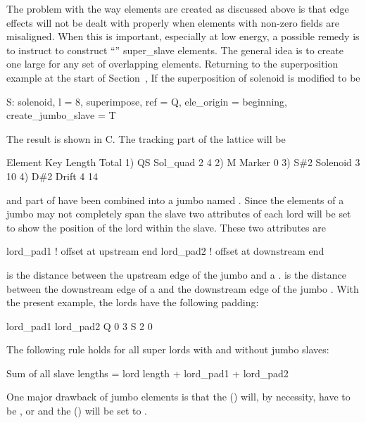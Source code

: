 The problem with the way  elements are created as discussed above is that edge
effects will not be dealt with properly when elements with non-zero fields are misaligned. When this
is important, especially at low energy, a possible remedy is to instruct \bmad to construct
``'' super_slave elements. The general idea is to create one large  for
any set of overlapping elements. Returning to the superposition example at the start of
Section~, If the superposition of solenoid  is modified to be
\begin{example}
  S: solenoid, l = 8, superimpose, ref = Q, ele_origin = beginning, 
               create_jumbo_slave = T
\end{example}
The result is shown in C. The tracking part of the lattice will be
\begin{example}
        Element   Key         Length  Total     
  1)    Q{\B}S       Sol_quad     2        4
  2)    M         Marker       0      
  3)    S{\#}2       Solenoid     3       10
  4)    D{\#}2       Drift        4       14
\end{example}
 and part of  have been combined into a jumbo  named . Since
the  elements of a jumbo  may not completely span the slave two
attributes of each lord will be set to show the position of the lord within the slave. These two
attributes are
\begin{example}
  lord_pad1    ! offset at upstream end
  lord_pad2    ! offset at downstream end
\end{example}
 is the distance between the upstream edge of the jumbo  and a
.  is the distance between the downstream edge of a  and
the downstream edge of the jumbo . With the present example, the lords have the
following padding:
\begin{example}
          lord_pad1    lord_pad2
  Q            0            3
  S            2            0
\end{example}
The following rule holds for all super lords with and without jumbo slaves:
\begin{example}
  Sum of all slave lengths = lord length + lord_pad1 + lord_pad2
\end{example}

One major drawback of jumbo  elements is that the 
() will, by necessity, have to be , or  and the
 () will be set to .

